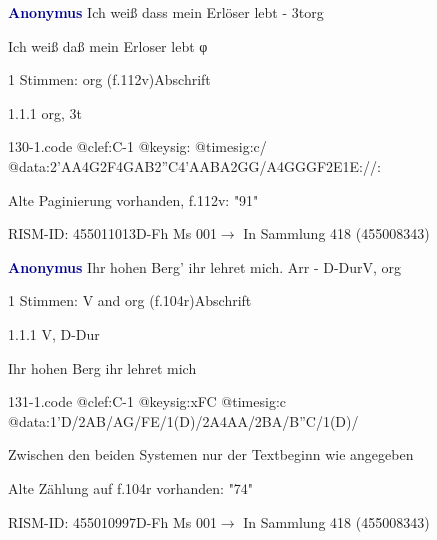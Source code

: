 \documentclass[twocolumn]{book}
\begin{document}
\par \vspace{7pt} \textcolor{darkblue}{\textbf{Anonymus  }}\hfillplus{\textbf{[130]}}\newline Ich weiß dass mein Erlöser lebt - 3t\newline org
\par \begin{itshape}[f.112v, heading:] Ich weiß daß mein Erloser lebt φ\end{itshape} 
\par \textcolor{darkblue}{}  1 Stimmen: org  (f.112v)\newline Abschrift
\par 1.1.1  org, 3t  
\begin{filecontents*}{130-1.code}
@clef:C-1
@keysig:
@timesig:c/
@data:2'AA4G2F4GAB2''C4'AABA2GG/A4GGGF2E1E://:
\end{filecontents*}
\newline
%
\par Alte Paginierung vorhanden, f.112v: "91"
\par RISM-ID: 455011013\newline D-Fh  Ms 001\newline $\rightarrow$ In Sammlung 418 (455008343)
      
\par \vspace{7pt} \textcolor{darkblue}{\textbf{Anonymus  }}\hfillplus{\textbf{[131]}}\newline Ihr hohen Berg' ihr lehret mich. Arr - D-Dur\newline V, org
\par \begin{itshape}\end{itshape} 
\par \textcolor{darkblue}{}  1 Stimmen: V and org  (f.104r)\newline Abschrift
\par 1.1.1  V, D-Dur\newline \begin{footnotesize} Ihr hohen Berg ihr lehret mich \end{footnotesize}  
\begin{filecontents*}{131-1.code}
@clef:C-1
@keysig:xFC
@timesig:c
@data:1'D/2AB/AG/FE/1(D)/2A4AA/2BA/B''C/1(D)/
\end{filecontents*}
\newline
%
\par Zwischen den beiden Systemen nur der Textbeginn wie angegeben
\par Alte Zählung auf f.104r vorhanden: "74"
\par RISM-ID: 455010997\newline D-Fh  Ms 001\newline $\rightarrow$ In Sammlung 418 (455008343)
      
\end{document}
